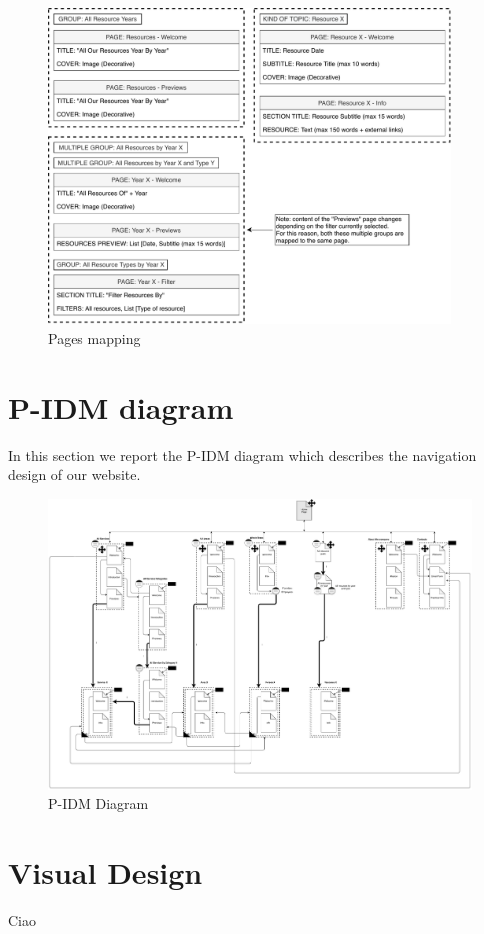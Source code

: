 \documentclass[12pt]{report}
\begin{document}
\begin{figure}[h]
	\centering
	\includegraphics[width=0.95\textwidth]{page_mapping_pt3.pdf}
	\caption{Pages mapping}
\end{figure}

\chapter{P-IDM diagram}
In this section we report the P-IDM diagram which describes the navigation design of our website.\\
\begin{figure}[h]
	\centering
	\includegraphics[width=\textwidth]{P-IDM.pdf}
	\caption{P-IDM Diagram}
\end{figure}

\chapter{Visual Design}
Ciao 

\end{document}
